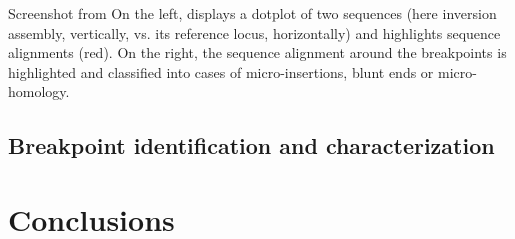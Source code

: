     {Screenshot from \maze}
    {On the left, \maze displays a dotplot of two sequences (here inversion
    assembly, vertically, vs. its reference locus, horizontally) and highlights
    sequence alignments (red). On the right, the sequence alignment around the
    breakpoints is highlighted and classified into cases of micro-insertions,
    blunt ends or micro-homology.}


\subsection{Breakpoint identification and characterization}



\section{Conclusions}
